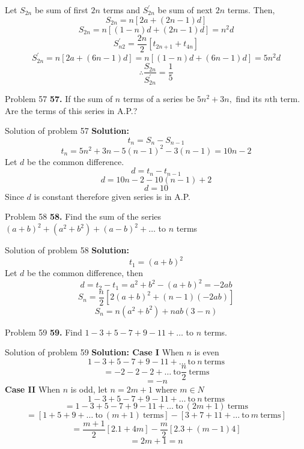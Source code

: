 \documentclass[aspectratio=1610,8pt]{beamer}
\begin{document}
\begin{frame}
  Let $S_{2n}$ be sum of first $2n$ terms and $S_{2n}^{\prime}$ be sum of next
  $2n$ terms. Then,\\
  $$S_{2n} = n[2a + (2n - 1)d]$$
  $$S_{2n} = n[(1 - n)d + (2n - 1)d] = n^2d$$
  $$S_{n2}^{\prime} = \frac{2n}{2}[t_{2n + 1} + t_{4n}]$$
  $$S_{2n}^{\prime} = n[2a + (6n - 1)d] = n[(1 - n)d + (6n - 1)d] = 5n^2d$$
  $$\therefore \frac{S_{2n}}{S_{2n}^{\prime}} = \frac{1}{5}$$
\end{frame}
\begin{frame}{Problem 57}
  \textbf{57.} If the sum of $n$ terms of a series be $5n^2 + 3n,$ find its
  $n$th term. Are the terms of this series in A.P.?
\end{frame}
\begin{frame}{Solution of problem 57}
  \textbf{Solution:} $$t_n = S_n - S_{n - 1}$$
  $$t_n = 5n^2 + 3n - 5(n - 1)^2 - 3(n - 1) = 10n - 2$$
  Let $d$ be the common difference.\\
  $$d = t_n - t_{n - 1}$$
  $$d = 10n - 2 - 10(n - 1) + 2$$
  $$d = 10$$
  Since $d$ is constant therefore given series is in A.P.
\end{frame}
\begin{frame}{Problem 58}
  \textbf{58.} Find the sum of the series $(a + b)^2 + (a^2 + b^2) + (a - b)^2 + \ldots$ to
  $n$ terms
\end{frame}
\begin{frame}{Solution of problem 58}
  \textbf{Solution:} $$t_1 = (a + b)^2$$
  Let $d$ be the common difference, then
  $$d = t_2 - t_1 = a^2 + b^2 - (a + b)^2 = -2ab$$
  $$S_n = \frac{n}{2}[2(a + b)^2 + (n - 1)(-2ab)]$$
  $$S_n = n(a^2 + b^2) + nab(3 - n)$$
\end{frame}
\begin{frame}{Problem 59}
  \textbf{59.} Find $1 - 3 + 5 - 7 + 9 - 11 + \ldots$ to $n$ terms.
\end{frame}
\begin{frame}{Solution of problem 59}
  \textbf{Solution: Case I} When $n$ is even
  $$1 - 3 + 5 - 7 + 9 - 11 + \ldots~\text{to}~n~\text{terms}$$
  $$= -2 - 2 - 2 + \ldots~\text{to} \frac{n}{2}~\text{terms}$$
  $$= -n$$
  \textbf{Case II} When $n$ is odd, let $n = 2m + 1$ where $m \in N$
  $$1 - 3 + 5 - 7 + 9 - 11 + \ldots~\text{to}~n~\text{terms}$$
  $$=1 - 3 + 5 - 7 + 9 - 11 + \ldots~\text{to}~(2m + 1)~\text{terms}$$
  $$=[1 + 5 + 9 + \ldots~\text{to}~(m + 1)~\text{terms}] - [3 + 7 + 11 +
    \ldots~\text{to}~m~\text{terms}]$$
  $$= \frac{m + 1}{2}[2.1 + 4m] - \frac{m}{2}[2.3 + (m - 1)4]$$
  $$= 2m + 1 = n$$
\end{frame}
\end{document}
